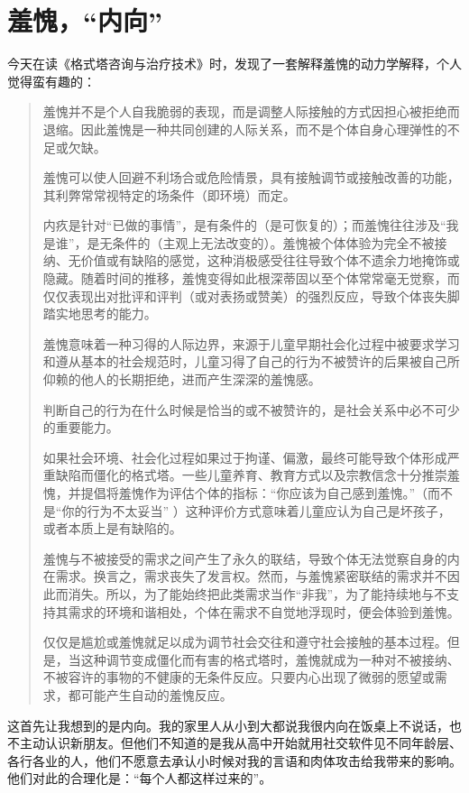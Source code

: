 \chapter{羞愧，“内向”}



今天在读《格式塔咨询与治疗技术》时，发现了一套解释羞愧的动力学解释，个人觉得蛮有趣的：

\blockquote{
	羞愧并不是个人自我脆弱的表现，而是调整人际接触的方式\pozhehao{}因担心被拒绝而退缩。因此羞愧是一种共同创建的人际关系，而不是个体自身心理弹性的不足或欠缺。

	羞愧可以使人回避不利场合或危险情景，具有接触调节或接触改善的功能，其利弊常常视特定的场条件（即环境）而定。

	内疚是针对“已做的事情”，是有条件的（是可恢复的）；而羞愧往往涉及“我是谁”，是无条件的（主观上无法改变的）。羞愧被个体体验为完全不被接纳、无价值或有缺陷的感觉，这种消极感受往往导致个体不遗余力地掩饰或隐藏。随着时间的推移，羞愧变得如此根深蒂固以至个体常常毫无觉察，而仅仅表现出对批评和评判（或对表扬或赞美）的强烈反应，导致个体丧失脚踏实地思考的能力。

	羞愧意味着一种习得的人际边界，来源于儿童早期社会化过程中被要求学习和遵从基本的社会规范时，儿童习得了自己的行为不被赞许的后果\pozhehao{}被自己所仰赖的他人的长期拒绝，进而产生深深的羞愧感。

	判断自己的行为在什么时候是恰当的或不被赞许的，是社会关系中必不可少的重要能力。

	如果社会环境、社会化过程如果过于拘谨、偏激，最终可能导致个体形成严重缺陷而僵化的格式塔。一些儿童养育、教育方式以及宗教信念十分推崇羞愧，并提倡将羞愧作为评估个体的指标：“你应该为自己感到羞愧。”（而不是“你的行为不太妥当” ）这种评价方式意味着儿童应认为自己是坏孩子，或者本质上是有缺陷的。

	羞愧与不被接受的需求之间产生了永久的联结，导致个体无法觉察自身的内在需求。换言之，需求丧失了发言权。然而，与羞愧紧密联结的需求并不因此而消失。所以，为了能始终把此类需求当作“非我”，为了能持续地与不支持其需求的环境和谐相处，个体在需求不自觉地浮现时，便会体验到羞愧。

	仅仅是尴尬或羞愧就足以成为调节社会交往和遵守社会接触的基本过程。但是，当这种调节变成僵化而有害的格式塔时，羞愧就成为一种对不被接纳、不被容许的事物的不健康的无条件反应。只要内心出现了微弱的愿望或需求，都可能产生自动的羞愧反应。
}

这首先让我想到的是内向。我的家里人从小到大都说我很内向\pozhehao{}在饭桌上不说话，也不主动认识新朋友。但他们不知道的是我从高中开始就用社交软件见不同年龄层、各行各业的人，他们不愿意去承认小时候对我的言语和肉体攻击给我带来的影响。他们对此的合理化是：“每个人都这样过来的”。

